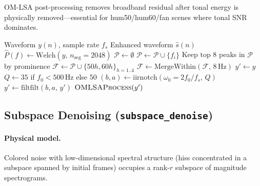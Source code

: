 OM-LSA post-processing removes broadband residual after tonal energy is physically removed---essential for hum50/hum60/fan scenes where tonal SNR dominates.

\begin{algorithm}[H]
  \caption{Adaptive notch bank + OM-LSA (\texttt{adaptive\_notch\_bank})}
  \label{alg:notch_bank}
  \begin{algorithmic}[1]
    \Require Waveform $y(n)$, sample rate $f_s$
    \Ensure Enhanced waveform $\hat{s}(n)$
    \State $\hat{P}(f) \gets \mathrm{Welch}(y,\, n_{\mathrm{seg}}=2048)$
    \State $\mathcal{P} \gets \emptyset$
        \State $\mathcal{P} \gets \mathcal{P} \cup \{f_i\}$
      \EndIf
    \EndFor
    \State Keep top 8 peaks in $\mathcal{P}$ by prominence
    \State $\mathcal{F} \gets \mathcal{P} \cup \{50h, 60h\}_{h=1..4}$
    \State $\mathcal{F} \gets \mathrm{MergeWithin}(\mathcal{F},\, 8\,\mathrm{Hz})$
    \State $y' \gets y$
      \State $Q \gets 35$ if $f_0<500$\,Hz else $50$
      \State $(b,a) \gets \mathrm{iirnotch}(\omega_0=2f_0/f_s,\, Q)$
      \State $y' \gets \mathrm{filtfilt}(b,a,\, y')$ 
    \EndFor
    \State \Return $\textsc{OMLSAProcess}(y')$
  \end{algorithmic}
\end{algorithm}

\subsection{Subspace Denoising (\texttt{subspace\_denoise})}

\paragraph{Physical model.}
Colored noise with low-dimensional spectral structure (hiss concentrated in a subspace spanned by initial frames) occupies a rank-$r$ subspace of magnitude spectrograms.

